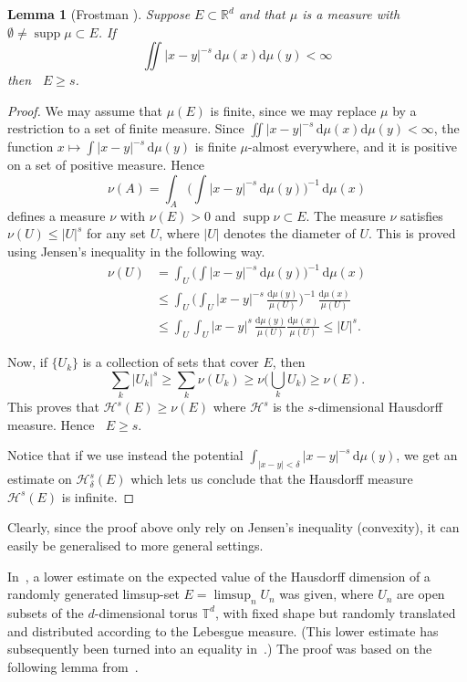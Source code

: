 \documentclass[10pt]{amsart}
\newtheorem{lemm}[theo]{Lemma}\newtheorem{prop}[theo]{Proposition}\newtheorem{coro}[theo]{Corollary}\newtheorem{conj}[theo]{Conjecture}
\theoremstyle{definition}\newtheorem{defi}[theo]{Definition}\newtheorem{rema}[theo]{Remark}\newtheorem{exam}[theo]{Example}\newtheorem{exem}[theo]{Example}\newtheorem{nota}[theo]{Notation}
\DeclareMathOperator{\dimh}{dim_H}
\DeclareMathOperator{\supp}{supp}
\newcommand*{\dd}{\mathrm{d}}
\begin{document}
\begin{lemm}[Frostman {\cite[Th\'eor\`eme~47.2]{frostman}}]\label{lem:classical}
Suppose $E \subset \mathbb{R}^d$ and that $\mu$ is a measure with $\emptyset \neq \supp \mu \subset E$. If
\[
\iint |x-y|^{-s} \, \dd\mu (x) \dd \mu (y) < \infty
\]
then $\dimh E \geq s$.
\end{lemm}

\begin{proof}
We may assume that $\mu (E)$ is finite, since we may replace $\mu$ by a restriction to a set of finite measure. Since $\iint |x-y|^{-s}
\, \dd\mu (x) \dd \mu (y) < \infty$, the function $x
\mapsto \int |x-y|^{-s} \, \dd \mu (y)$ is finite $\mu$-almost everywhere, and it is positive on a set of positive measure. Hence
\[
\nu (A) = \int_A \biggl(\int |x-y|^{-s} \, \dd \mu (y)
\biggr)^{-1} \, \dd \mu (x)
\]
defines a measure $\nu$ with $\nu (E) > 0$ and $\supp \nu \subset E$. The measure $\nu$ satisfies $\nu(U) \leq |U|^s$ for any set $U$, where $|U|$ denotes the diameter of $U$. This is proved using Jensen's inequality in the following way.
\begin{align*}
\nu (U) &= \int_U \biggl(\int |x-y|^{-s} \, \dd \mu (y)
\biggr)^{-1} \, \dd \mu (x) \\ &\leq \int_U \biggl(\int_U |x-y|^{-s} \, \frac{\dd \mu (y)}{\mu (U)} \biggr)^{-1} \,
\frac{\dd \mu (x)}{\mu (U)} \\ &\leq \int_U \int_U |x-y|^{s} \, \frac{\dd \mu (y)}{\mu (U)} \frac{\dd
\mu (x)}{\mu (U)} \leq |U|^s.
\end{align*}

Now, if $\{U_k\}$ is a collection of sets that cover $E$, then
\[
\sum_k |U_k|^s \geq \sum_k \nu (U_k) \geq \nu \biggl(\bigcup_k U_k
\biggr) \geq \nu (E).
\]
This proves that $\mathscr{H}^s (E) \geq \nu (E)$ where $\mathscr{H}^s$ is the $s$-dimensional Hausdorff measure. Hence $\dimh E \geq s$.

Notice that if we use instead the potential $\int_{|x-y|<\delta} |x-y|^{-s} \, \dd \mu (y)$, we get an estimate on $\mathscr{H}_\delta^s (E)$ which lets us conclude that the Hausdorff measure $\mathscr{H}^s (E)$ is infinite.
\end{proof}

Clearly, since the proof above only rely on Jensen's inequality (convexity), it can easily be generalised to more general settings.

In~\cite{persson}, a lower estimate on the expected value of the Hausdorff dimension of a randomly generated limsup-set $E = \limsup_n U_n$ was given, where $U_n$ are open subsets of the $d$-dimensional torus $\mathbb{T}^d$, with fixed shape but randomly translated and distributed according to the Lebesgue measure. (This lower estimate has subsequently been turned into an equality in~\cite{fengetal}.) The proof was based on the following lemma from~\cite{perssonreeve}.
\end{document}
